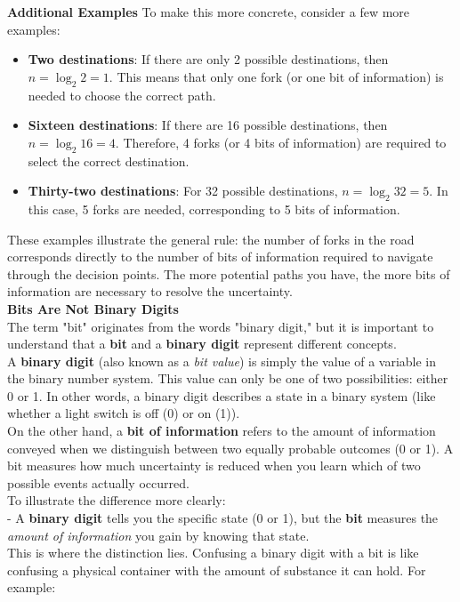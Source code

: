 \documentclass[12pt, oneside]{book}
\begin{document}
\textbf{Additional Examples}
To make this more concrete, consider a few more examples:
\begin{itemize}
		\item \textbf{Two destinations}: If there are only 2 possible destinations, then \(n = \log_2 2 = 1\). This means that only one fork (or one bit of information) is needed to choose the correct path.
		\item \textbf{Sixteen destinations}:  If there are 16 possible destinations, then \(n = \log_2 16 = 4\). Therefore, 4 forks (or 4 bits of information) are required to select the correct destination.
		\item \textbf{Thirty-two destinations}: For 32 possible destinations, \(n = \log_2 32 = 5\). In this case, 5 forks are needed, corresponding to 5 bits of information.
\end{itemize}
These examples illustrate the general rule: the number of forks in the road corresponds directly to the number of bits of information required to navigate through the decision points. The more potential paths you have, the more bits of information are necessary to resolve the uncertainty.\vspace{0.5cm}\\
\textbf{Bits Are Not Binary Digits}\\
The term "bit" originates from the words "binary digit," but it is important to understand that a \textbf{bit} and a \textbf{binary digit} represent different concepts.\\
A \textbf{binary digit} (also known as a \textit{bit value}) is simply the value of a variable in the binary number system. This value can only be one of two possibilities: either 0 or 1. In other words, a binary digit describes a state in a binary system (like whether a light switch is off (0) or on (1)).\\
On the other hand, a \textbf{bit of information} refers to the amount of information conveyed when we distinguish between two equally probable outcomes (0 or 1). A bit measures how much uncertainty is reduced when you learn which of two possible events actually occurred.\\
To illustrate the difference more clearly:\\
- A \textbf{binary digit} tells you the specific state (0 or 1), but the \textbf{bit} measures the \textit{amount of information} you gain by knowing that state.\\
This is where the distinction lies. Confusing a binary digit with a bit is like confusing a physical container with the amount of substance it can hold. For example:\\
\end{document}
